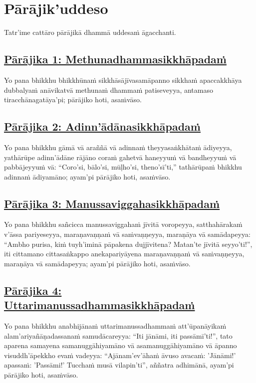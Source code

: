 \section{Pārājik'uddeso}
\label{par}

\begin{intro}
  Tatr'ime cattāro pārājikā dhammā uddesaṁ āgacchanti.
\end{intro}

\setsubsecheadstyle{\subsubsectionFmt}
\subsection*{\hyperref[disq1]{Pārājika 1: Methunadhammasikkhāpadaṁ}}
\label{par1}
Yo pana bhikkhu bhikkhūnaṁ sikkhāsājīvasamāpanno sikkhaṁ apaccakkhāya dubbalyaṁ anāvikatvā methunaṁ dhammaṁ patiseveyya, antamaso tiracchānagatāya'pi; pārājiko hoti, asaṁvāso.

\subsection*{\hyperref[disq2]{Pārājika 2: Adinn'ādānasikkhāpadaṁ}}
\label{par2}
Yo pana bhikkhu gāmā vā araññā vā adinnaṁ theyyasaṅkhātaṁ ādiyeyya, yathārūpe adinn'ādāne rājāno coraṁ gahetvā haneyyuṁ vā bandheyyuṁ vā pabbājeyyuṁ vā: ``Coro'si, bālo'si, mūḷho'si, theno'sī'ti,'' tathārūpaṁ bhikkhu adinnaṁ ādiyamāno; ayam'pi pārājiko hoti, asaṁvāso.

\subsection*{\hyperref[disq3]{Pārājika 3: Manussaviggahasikkhāpadaṁ}}
\label{par3}
Yo pana bhikkhu sañcicca manussaviggahaṁ jīvitā voropeyya, satthahārakaṁ v'āssa pariyeseyya, maraṇavaṇṇaṁ vā saṁvaṇṇeyya, maraṇāya vā samādapeyya: ``Ambho purisa, kiṁ tuyh'iminā pāpakena dujjīvitena? Matan'te jīvitā seyyo'ti!'', iti cittamano cittasaṅkappo anekapariyāyena maraṇavaṇṇaṁ vā saṁvaṇṇeyya, maraṇāya vā samādapeyya; ayam'pi pārājiko hoti, asaṁvāso.

\subsection*{\hyperref[disq4]{Pārājika 4: Uttarimanussadhammasikkhāpadaṁ}}
\label{par4}
Yo pana bhikkhu anabhijānaṁ uttarimanussadhammaṁ att'ūpanāyikaṁ alam'ariyañāṇadassanaṁ samudācareyya: ``Iti jānāmi, iti passāmī'ti!'', tato aparena samayena samanuggāhiyamāno vā asamanuggāhiyamāno vā āpanno visuddh'āpekkho evaṁ vadeyya: ``Ajānam'ev'āhaṁ āvuso avacaṁ: 'Jānāmi!' apassaṁ: 'Passāmi!' Tucchaṁ musā vilapin'ti'', aññatra adhimānā, ayam'pi pārājiko hoti, asaṁvāso.

